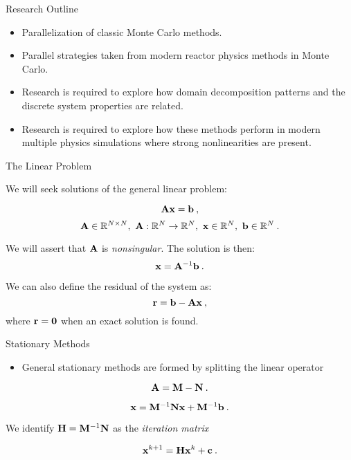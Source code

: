 \documentclass{beamer}
\begin{document}
\begin{frame}{Research Outline}
  \begin{itemize}
    \item Parallelization of classic Monte Carlo methods.
    \item Parallel strategies taken from modern reactor physics
      methods in Monte Carlo.
    \item Research is required to explore how domain decomposition
      patterns and the discrete system properties are related.
    \item Research is required to explore how these methods perform
      in modern multiple physics simulations where strong
      nonlinearities are present.
  \end{itemize}
\end{frame}

\begin{frame}{The Linear Problem}

  We will seek solutions of the general linear problem:

  \[
  \mathbf{A} \mathbf{x} = \mathbf{b}\:,
  \]
  \[
  \mathbf{A} \in \mathbb{R}^{N \times N},\ \mathbf{A} : \mathbb{R}^{N}
  \rightarrow \mathbb{R}^{N},\ \mathbf{x} \in \mathbb{R}^N,\ \mathbf{b} \in
  \mathbb{R}^N\:.
  \]

  We will assert that $\mathbf{A}$ is \textit{nonsingular}. The solution
  is then:
  \[
  \mathbf{x} = \mathbf{A}^{-1}\mathbf{b}\:.
  \]

  We can also define the residual of the system as:
  \[
  \mathbf{r} = \mathbf{b} - \mathbf{A}\mathbf{x}\:,
  \]
  where $\mathbf{r}=\mathbf{0}$ when an exact solution is found.

\end{frame}

\begin{frame}{Stationary Methods}

  \begin{itemize}
  \item General stationary methods are formed by splitting the linear
    operator
  \end{itemize}

  \[
  \mathbf{A} = \mathbf{M} - \mathbf{N}\:.
  \]

  \[
  \mathbf{x} = \mathbf{M}^{-1}\mathbf{N}\mathbf{x} + \mathbf{M}^{-1}\mathbf{b}\:.
  \]

  We identify $\mathbf{H} =\mathbf{M}^{-1}\mathbf{N}$ as the \textit{iteration
    matrix}

  \[
  \mathbf{x}^{k+1} = \mathbf{H}\mathbf{x}^{k} + \mathbf{c}\:.
  \]

\end{frame}
\end{document}
